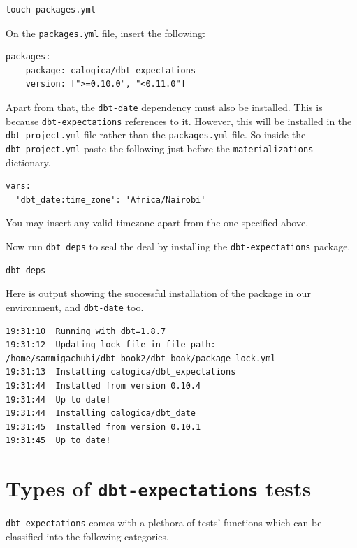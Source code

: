 \documentclass[
]{book}
\begin{document}
\begin{verbatim}
touch packages.yml
\end{verbatim}

On the \texttt{packages.yml} file, insert the following:

\begin{verbatim}
packages:
  - package: calogica/dbt_expectations
    version: [">=0.10.0", "<0.11.0"]
\end{verbatim}

Apart from that, the \texttt{dbt-date} dependency must also be installed. This is because \texttt{dbt-expectations} references to it. However, this will be installed in the \texttt{dbt\_project.yml} file rather than the \texttt{packages.yml} file. So inside the \texttt{dbt\_project.yml} paste the following just before the \texttt{materializations} dictionary.

\begin{verbatim}
vars:
  'dbt_date:time_zone': 'Africa/Nairobi'
\end{verbatim}

You may insert any valid timezone apart from the one specified above.

Now run \texttt{dbt\ deps} to seal the deal by installing the \texttt{dbt-expectations} package.

\begin{verbatim}
dbt deps
\end{verbatim}

Here is output showing the successful installation of the package in our environment, and \texttt{dbt-date} too.

\begin{verbatim}
19:31:10  Running with dbt=1.8.7
19:31:12  Updating lock file in file path: /home/sammigachuhi/dbt_book2/dbt_book/package-lock.yml
19:31:13  Installing calogica/dbt_expectations
19:31:44  Installed from version 0.10.4
19:31:44  Up to date!
19:31:44  Installing calogica/dbt_date
19:31:45  Installed from version 0.10.1
19:31:45  Up to date!
\end{verbatim}

\hypertarget{types-of-dbt-expectations-tests}{%
\section{\texorpdfstring{Types of \texttt{dbt-expectations} tests}{Types of dbt-expectations tests}}\label{types-of-dbt-expectations-tests}}

\texttt{dbt-expectations} comes with a plethora of tests' functions which can be classified into the following categories.
\end{document}
